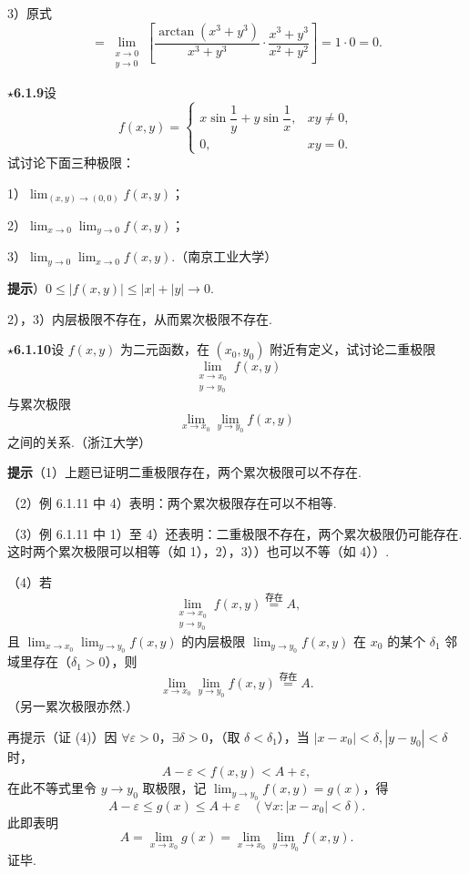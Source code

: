 \documentclass[UTF8, 12pt, fontset=fandol, oneside]{ctexart}
\begin{document}
3）原式
\[
  =\lim_{\substack{x\to0\\ y\to0}}
  \left[
  \frac{\arctan(x^3+y^3)}{x^3+y^3}\cdot
  \frac{x^3+y^3}{x^2+y^2}
  \right]=1\cdot0=0.
\]

\noindent\textbf{$\star$6.1.9}\quad 设
\[
f(x,y)=
\begin{cases}
x\sin\dfrac1y+y\sin\dfrac1x, & xy\ne0,\\
0, & xy=0.
\end{cases}
\]
试讨论下面三种极限：

1）$\displaystyle\lim_{(x,y)\to(0,0)}f(x,y)$；

2）$\displaystyle\lim_{x\to0}\lim_{y\to0}f(x,y)$；

3）$\displaystyle\lim_{y\to0}\lim_{x\to0}f(x,y)$.（南京工业大学）

\noindent\textbf{提示}）$0\le |f(x,y)|\le |x|+|y|\to0$.

2），3）内层极限不存在，从而累次极限不存在.

\noindent\textbf{$\star$6.1.10}\quad 设 $f(x,y)$ 为二元函数，在 $(x_0,y_0)$ 附近有定义，试讨论二重极限
\[
  \lim_{\substack{x\to x_0\\ y\to y_0}}f(x,y)
\]
与累次极限
\[
  \lim_{x\to x_0}\lim_{y\to y_0}f(x,y)
\]
之间的关系.（浙江大学）

\noindent\textbf{提示}\quad （1）上题已证明二重极限存在，两个累次极限可以不存在.

（2）例 6.1.11 中 4）表明：两个累次极限存在可以不相等.

（3）例 6.1.11 中 1）至 4）还表明：二重极限不存在，两个累次极限仍可能存在. 这时两个累次极限可以相等（如 1），2），3））也可以不等（如 4））.

（4）若
\[
  \lim_{\substack{x\to x_0\\ y\to y_0}}f(x,y)\stackrel{\text{存在}}{=}A,
\]
且 $\displaystyle\lim_{x\to x_0}\lim_{y\to y_0}f(x,y)$ 的内层极限 $\displaystyle\lim_{y\to y_0}f(x,y)$ 在 $x_0$ 的某个 $\delta_1$ 邻域里存在（$\delta_1>0$），则
\[
  \lim_{x\to x_0}\lim_{y\to y_0}f(x,y)\stackrel{\text{存在}}{=}A.
\]
（另一累次极限亦然.）

再提示\quad （证 (4)）因 $\forall\varepsilon>0$，$\exists\delta>0$，（取 $\delta<\delta_1$），当 $|x-x_0|<\delta,|y-y_0|<\delta$ 时，
\[
  A-\varepsilon<f(x,y)<A+\varepsilon,
\]
在此不等式里令 $y\to y_0$ 取极限，记 $\displaystyle\lim_{y\to y_0}f(x,y)=g(x)$，得
\[
  A-\varepsilon\le g(x)\le A+\varepsilon\quad(\forall x:|x-x_0|<\delta).
\]
此即表明
\[
  A=\lim_{x\to x_0}g(x)
  =\lim_{x\to x_0}\lim_{y\to y_0}f(x,y).
\]
证毕.
\end{document}
